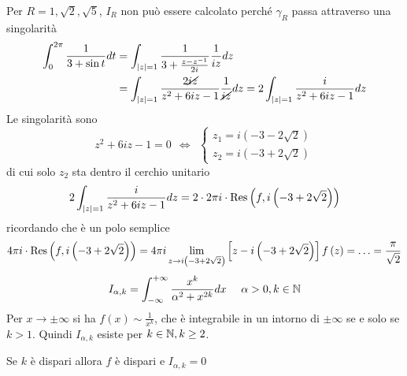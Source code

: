 Per $R = 1, \sqrt{2}, \sqrt{5}$, $I_{R}$ non può essere calcolato perché $\gamma_{R}$ passa attraverso una singolarità
\Soluzione
\begin{align*}
\int^{2\pi}_{0}\frac{1}{3 + \sin t} dt & = \int_{\left| z\right| = 1}\frac{1}{3 + \frac{z - z^{- 1}}{2i}}\frac{1}{iz} dz\\
 & = \int_{\left| z\right| = 1}\frac{2\cancel{iz}}{z^{2} + 6iz - 1}\frac{1}{\cancel{iz}} dz = 2\int_{\left| z\right| = 1}\frac{i}{z^{2} + 6iz - 1} dz
\end{align*}
Le singolarità sono
\begin{equation*}
z^{2} + 6iz - 1 = 0\ \ \iff \ \ 
\begin{cases}
z_{1} = i\left(- 3 - 2\sqrt{2}\right)\\
z_{2} = i\left(- 3 + 2\sqrt{2}\right)
\end{cases}
\end{equation*}
di cui solo $z_{2}$ sta dentro il cerchio unitario
\begin{equation*}
2\int_{\left| z\right| = 1}\frac{i}{z^{2} + 6iz - 1} dz = 2 \cdot 2\pi i \cdot \operatorname{Res} \left(f, i\left(- 3 + 2\sqrt{2}\right)\right)
\end{equation*}
ricordando che è un polo semplice
\begin{equation*}
4\pi i \cdot \operatorname{Res} \left(f, i\left(- 3 + 2\sqrt{2}\right)\right) = 4\pi i\lim\limits_{z\rightarrow i\left(- 3 + 2\sqrt{2}\right)}\left[ z - i\left(- 3 + 2\sqrt{2}\right)\right] f\left(z\right) = \dotsc = \frac{\pi}{\sqrt{2}}
\end{equation*}
\Soluzione
\begin{equation*}
I_{\alpha, k} = \int^{+ \infty}_{- \infty}\frac{x^{k}}{\alpha^{2} + x^{2k}} dx\ \ \ \ \alpha  > 0, k\in \mathbb{N} 
\end{equation*}
Per $x\rightarrow \pm \infty $ si ha $f\left(x\right) \sim \frac{1}{x^{k}}$, che è integrabile in un intorno di $\pm \infty $ se e solo se $k > 1$. Quindi $I_{\alpha, k}$ esiste per $k\in \mathbb{N}, k \geq 2$.

Se $k$ è dispari allora $f$ è dispari e $I_{\alpha, k} = 0$

